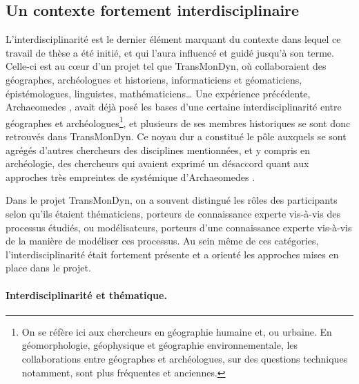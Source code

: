 \subsection{Un contexte fortement interdisciplinaire}

L'interdisciplinarité est le dernier élément marquant du contexte dans lequel ce travail de thèse a été initié, et qui l'aura influencé et guidé jusqu'à son terme.
Celle-ci est au cœur d'un projet tel que TransMonDyn, où collaboraient des géographes, archéologues et historiens, informaticiens et géomaticiens, épistémologues, linguistes, mathématiciens\ldots{}
Une expérience précédente, Archaeomedes \autocite{durand1998archaeomedes}, avait déjà posé les bases d'une certaine interdisciplinarité entre géographes et archéologues\footnote{
	On se réfère ici aux chercheurs en géographie humaine et, ou urbaine.
	En géomorphologie, géophysique et géographie environnementale, les collaborations entre géographes et archéologues, sur des questions techniques notamment, sont plus fréquentes et anciennes.
}, et plusieurs de ses membres historiques se sont donc retrouvés dans TransMonDyn.
Ce \og noyau dur\fg{} a constitué le pôle auxquels se sont agrégés d'autres chercheurs des disciplines mentionnées, et y compris en archéologie, des chercheurs qui avaient exprimé un désaccord quant aux approches très empreintes de systémique d'Archaeomedes \autocite[voir][par exemple]{ferdiere_modelisation_2000}.


Dans le projet TransMonDyn, on a souvent distingué les rôles des participants selon qu'ils étaient \og thématiciens\fg{}, porteurs de connaissance experte vis-à-vis des processus étudiés, ou \og modélisateurs\fg{}, porteurs d'une connaissance experte vis-à-vis de la manière de modéliser ces processus.
Au sein même de ces catégories, l'interdisciplinarité était fortement présente et a orienté les approches mises en place dans le projet.

\paragraph{Interdisciplinarité et thématique.}

